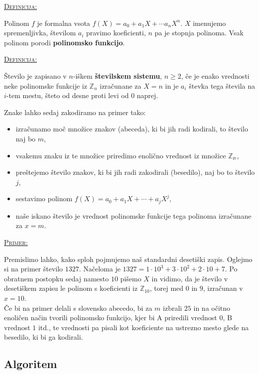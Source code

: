 \documentclass[a4paper, 12pt]{article} %
\newcommand{\Zn}{\mathbb{Z}_n}
\newenvironment{matematika}[1]{
\textcolor{bostonuniversityred}{\underline{\textsc{#1:}}}
}{
}
\begin{document}
\begin{matematika}{Definicija}
Polinom $f$ je formalna vsota $f(X) = a_0 + a_1 X + \cdots a_n X^n$. $X$ imenujemo spremenljivka, številom $a_i$ pravimo koeficienti, $n$ pa je stopnja polinoma. Vsak polinom porodi \textbf{polinomsko funkcijo}. \\
\end{matematika}

\begin{matematika}{Definicija}
Število je zapisano v $n$-iškem \textbf{številskem sistemu}, $n \geq 2$, če je enako vrednosti neke polinomske funkcije iz $\Zn$ izračunane za $X = n$ in je $a_i$ števka tega števila na $i$-tem mestu, šteto od desne proti levi od $0$ naprej. \\
\end{matematika}

Znake lahko sedaj zakodiramo na primer tako:
\begin{itemize}[label=]
\item izračunamo moč množice znakov (abeceda), ki bi jih radi kodirali, to število naj bo $m$,
\item vsakemu znaku iz te množice priredimo enolično vrednost iz množice $\mathbb{Z_m}$,
\item preštejemo število znakov, ki bi jih radi zakodirali (besedilo), naj bo to število $j$,
\item sestavimo polinom $f(X) = a_0 + a_1 X + \cdots + a_j X^j$,
\item naše iskano število je vrednost polinomske funkcije tega polinoma izračunane za $x=m$.
\end{itemize}
\begin{matematika}{Primer}
Premislimo lahko, kako sploh pojmujemo naš standardni desetiški zapis. Oglejmo si na primer število $1327$. Načeloma je $1327 = 1 \cdot 10^3 + 3 \cdot 10^2 + 2 \cdot 10 + 7$. Po obratnem postopku sedaj namesto $10$ pišemo $X$ in vidimo, da je število v desetiškem zapisu le polinom s koeficienti iz $\mathbb{Z}_{10}$, torej med $0$ in $9$, izračunan v $x = 10$. \\
Če bi na primer delali s slovensko abecedo, bi za $m$ izbrali $25$ in na očitno enoličen način tvorili polinomsko funkcijo, kjer bi A priredili vrednost $0$, B vrednost $1$ itd., te vrednosti pa pisali kot koeficiente na ustrezno mesto glede na besedilo, ki bi ga kodirali. \\
\end{matematika}

\subsection{Algoritem}
\end{document}
